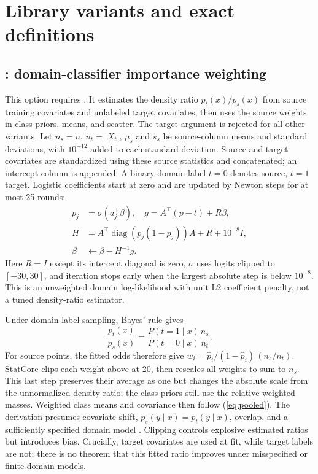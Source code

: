 \documentclass[conference]{IEEEtran}
\begin{document}
\section{Library variants and exact definitions}
\subsection{: domain-classifier importance weighting}
This option requires . It estimates the density ratio \(p_t(x)/p_s(x)\) from source training covariates and unlabeled target covariates, then uses the source weights in class priors, means, and scatter. The target argument is rejected for all other variants. Let \(n_s=n\), \(n_t=|X_t|\), \(\mu_s\) and \(s_s\) be source-column means and standard deviations, with \(10^{-12}\) added to each standard deviation. Source and target covariates are standardized using these source statistics and concatenated; an intercept column is appended. A binary domain label \(t=0\) denotes source, \(t=1\) target. Logistic coefficients start at zero and are updated by Newton steps for at most 25 rounds:
\begin{align}
p_j&=\sigma(a_j^\top\beta),\quad g=A^\top(p-t)+R\beta,\\
H&=A^\top\operatorname{diag}(p_j(1-p_j))A+R+10^{-8}I,\\
\beta&\leftarrow\beta-H^{-1}g.
\end{align}
Here \(R=I\) except its intercept diagonal is zero, \(\sigma\) uses logits clipped to \([-30,30]\), and iteration stops early when the largest absolute step is below \(10^{-8}\). This is an unweighted domain log-likelihood with unit L2 coefficient penalty, not a tuned density-ratio estimator.

Under domain-label sampling, Bayes' rule gives
\begin{equation}
\frac{p_t(x)}{p_s(x)}=\frac{P(t=1\mid x)}{P(t=0\mid x)}\frac{n_s}{n_t}.
\end{equation}
For source points, the fitted odds therefore give \(w_i=\hat p_i/(1-\hat p_i)\,(n_s/n_t)\). StatCore clips each weight above at 20, then rescales all weights to sum to \(n_s\). This last step preserves their average as one but changes the absolute scale from the unnormalized density ratio; the class priors still use the relative weighted masses. Weighted class means and covariance then follow (\ref{eq:pooled}). The derivation presumes covariate shift, \(p_s(y\mid x)=p_t(y\mid x)\), overlap, and a sufficiently specified domain model \cite{shimodaira2000}. Clipping controls explosive estimated ratios but introduces bias. Crucially, target covariates are used at fit, while target labels are not; there is no theorem that this fitted ratio improves under misspecified or finite-domain models.
\end{document}

